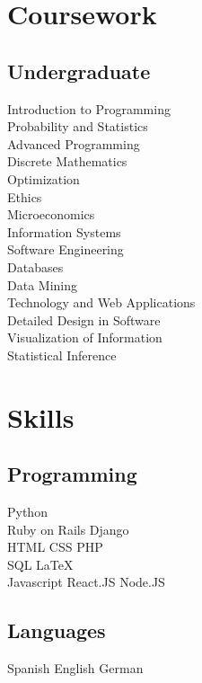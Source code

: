 \documentclass[]{deedy-resume-openfont}
\begin{document}
\begin{minipage}[t]{0.33\textwidth}
\section{Coursework}



\subsection{Undergraduate}
Introduction to Programming \\
Probability and Statistics\\
Advanced Programming\\
Discrete Mathematics\\
Optimization\\
Ethics\\
Microeconomics\\
Information Systems\\
Software Engineering\\
Databases\\
Data Mining\\
Technology and Web Applications\\
Detailed Design in Software\\
Visualization of Information\\
Statistical Inference\\


\section{Skills}
\subsection{Programming}
Python \\
Ruby on Rails \textbullet{} Django\\
HTML \textbullet{} CSS \textbullet{} PHP \\
SQL \textbullet{} LaTeX \\
Javascript \textbullet{} React.JS \textbullet{} Node.JS
\sectionsep

\subsection{Languages}
Spanish \textbullet{} English \textbullet{} German



%
%

\end{minipage} 
\end{document}

